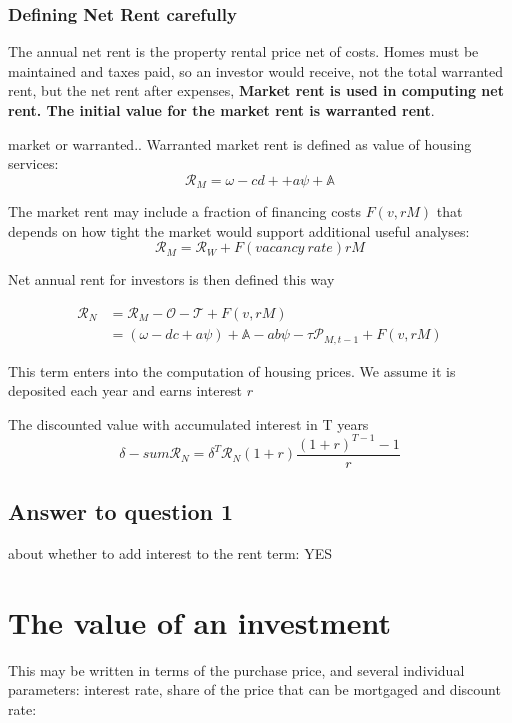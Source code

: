 \subsubsection{Defining Net Rent carefully}

The annual \gls{net rent} is the property rental price  net of costs. Homes must be maintained and taxes paid, so an investor would receive, not the total warranted rent, but the net rent after expenses,
\textbf{Market rent is used in computing net rent. The initial value for the market rent is \gls{warranted rent}}.

market or warranted..
Warranted market rent is defined as value of housing services:
\[\mathcal{R}_M = \omega - cd+ + a\psi + \mathbb{A}\]

The market rent may include  a fraction of financing costs $F(v, rM)$  that depends on how tight the market would support additional useful analyses:
 \[\mathcal{R}_M=\mathcal{R}_W + F(vacancy\ rate) rM\]

Net annual rent for investors is then  defined this way 

\begin{align}\mathcal{R}_N &= \mathcal{R}_M - \mathcal{O} - \mathcal{T} + F(v, rM)\nonumber\\
&= (\omega - {dc} + a\psi )+ \mathbb{A} - a b \psi - \tau  \mathcal{P}_{M, t-1}  + F(v, rM)
\end{align}

This term enters into the computation of housing prices. We assume it is deposited each year and earns interest $r$

The discounted value with accumulated interest in T years 
\[\delta-sum\mathcal{R}_N=\delta^T\mathcal{R}_N (1+r)\frac{(1+r)^{T-1}-1}{r} \]


\subsection{Answer to question 1} about whether to add interest to the rent term: YES

\section{The value of an investment}
 
 This may be written in terms of the purchase price, and several individual parameters: interest  rate, share of the price that can be mortgaged and  discount rate: 

